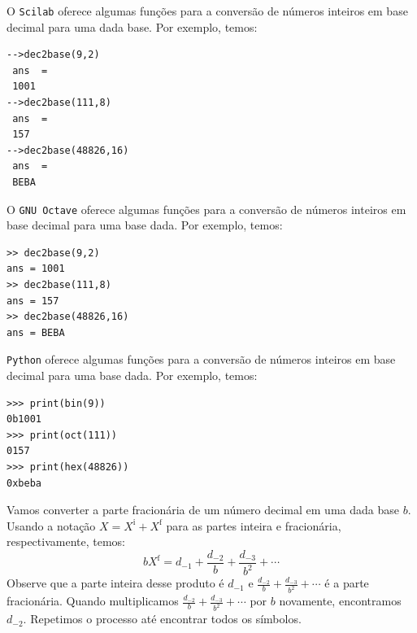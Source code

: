 \ifisscilab
\begin{obs}
  O \verb+Scilab+ oferece algumas funções para a conversão de números inteiros em base decimal para uma dada base. Por exemplo, temos:
\begin{verbatim}
-->dec2base(9,2)
 ans  =
 1001   
-->dec2base(111,8)
 ans  =
 157   
-->dec2base(48826,16)
 ans  =
 BEBA   
\end{verbatim}
\end{obs}
\fi
\ifisoctave
\begin{obs}
  O \verb+GNU Octave+ oferece algumas funções para a conversão de números inteiros em base decimal para uma base dada. Por exemplo, temos:
\begin{verbatim}
>> dec2base(9,2)
ans = 1001
>> dec2base(111,8)
ans = 157
>> dec2base(48826,16)
ans = BEBA
\end{verbatim}
\end{obs}
\fi
\ifispython
\begin{obs}
  \verb+Python+ oferece algumas funções para a conversão de números inteiros em base decimal para uma base dada. Por exemplo, temos:
\begin{verbatim}
>>> print(bin(9))
0b1001
>>> print(oct(111))
0157
>>> print(hex(48826))
0xbeba
\end{verbatim}
\end{obs}
\fi

Vamos converter a parte fracionária de um número decimal em uma dada base $b$. Usando a notação $X = X^{\mbox{i}} + X^{\mbox{f}}$ para as partes inteira e fracionária, respectivamente, temos:
\begin{equation*}
  bX^{\mbox{f}}=d_{-1}+\frac{d_{-2}}{b}+\frac{d_{-3}}{b^2}+\cdots  
\end{equation*}
Observe que a parte inteira desse produto é $d_{-1}$ e $\frac{d_{-2}}{b}+\frac{d_{-3}}{b^2}+\cdots$ é a parte fracionária. Quando multiplicamos $\frac{d_{-2}}{b}+\frac{d_{-3}}{b^2}+\cdots$ por $b$ novamente, encontramos $d_{-2}$. Repetimos o processo até encontrar todos os símbolos.

